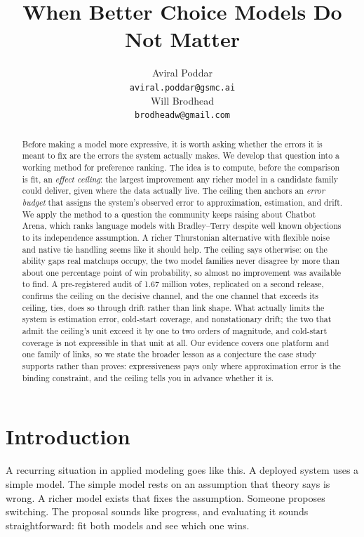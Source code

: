 \documentclass[10pt]{article}
\title{When Better Choice Models Do Not Matter}
\author{%
  \begin{tabular}{c}
    Aviral Poddar\\
    \texttt{aviral.poddar@gsmc.ai}
  \end{tabular}
  \hspace{2em}
  \begin{tabular}{c}
    Will Brodhead\\
    \texttt{brodheadw@gmail.com}
  \end{tabular}
}
\date{}
\begin{document}
\maketitle

\begin{abstract}
Before making a model more expressive, it is worth asking whether the
errors it is meant to fix are the errors the system actually makes. We
develop that question into a working method for preference ranking.
The idea is to compute, before the comparison is fit, an \emph{effect
ceiling}: the largest improvement any richer model in a candidate
family could deliver, given where the data actually live. The ceiling
then anchors an \emph{error budget} that assigns the system's observed
error to approximation, estimation, and drift. We apply the method to
a question the community keeps raising about Chatbot Arena, which
ranks language models with Bradley--Terry despite well known
objections to its independence assumption. A richer Thurstonian
alternative with flexible noise and native tie handling seems like it
should help. The ceiling says otherwise: on the ability gaps real
matchups occupy, the two model families never disagree by more than
about one percentage point of win probability, so almost no
improvement was available to find. A pre-registered audit of 1.67
million votes, replicated on a second release, confirms the ceiling
on the decisive channel, and the one channel that exceeds its
ceiling, ties, does so through drift rather than link shape. What
actually limits the system is estimation error, cold-start coverage,
and nonstationary drift; the two that admit the ceiling's unit exceed
it by one to two orders of magnitude, and cold-start coverage is not
expressible in that unit at all. Our evidence covers one platform and one family of
links, so we state the broader lesson as a conjecture the case study
supports rather than proves: expressiveness pays only where
approximation error is the binding constraint, and the ceiling tells
you in advance whether it is.
\end{abstract}

\section{Introduction}\label{sec:intro}

A recurring situation in applied modeling goes like this. A deployed
system uses a simple model. The simple model rests on an assumption
that theory says is wrong. A richer model exists that fixes the
assumption. Someone proposes switching. The proposal sounds like
progress, and evaluating it sounds straightforward: fit both models
and see which one wins.
\end{document}
